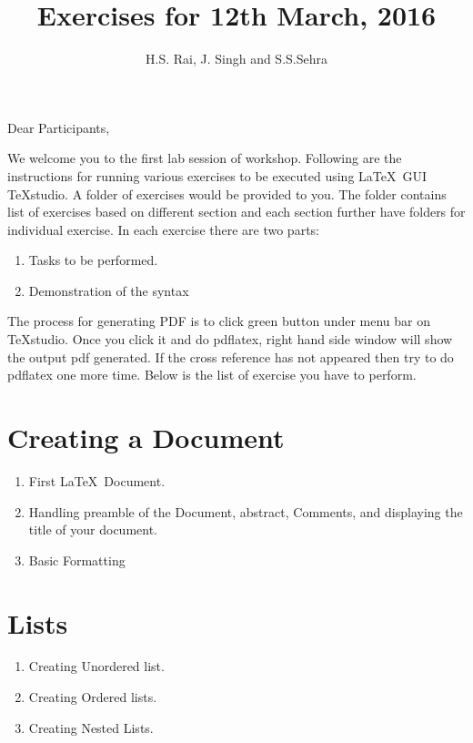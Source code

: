 \documentclass[11pt,a4paper]{article}
\author{H.S. Rai, J. Singh and S.S.Sehra}
\title{Exercises for 12th March, 2016}
\date{}
\begin{document}
\maketitle
Dear Participants,

We welcome you to the  first lab session of workshop. Following are the instructions for running various exercises to be executed using \LaTeX\ GUI \TeX studio. A folder of exercises would be provided to you. The folder contains list of exercises based on different section and each section further have folders for individual exercise. In each exercise there are two parts:
\begin{enumerate}
\item  Tasks to be performed.
\item Demonstration of the syntax
\end{enumerate}

The process for generating PDF is to click green button under menu bar on \TeX studio. Once you click it and do pdflatex, right hand side window will  show the output pdf generated. If the cross reference has not appeared then try to do pdflatex one more time. Below is the list of exercise you have to perform.

 
\section{Creating a Document}
 \begin{enumerate}
 \item First \LaTeX\ Document.
 \item Handling preamble of the Document, abstract, Comments, and displaying the title of your document. 
 \item Basic Formatting
 
 \end{enumerate}
\section{Lists}
 \begin{enumerate}
 \item Creating Unordered list.
 \item Creating Ordered lists.
 \item Creating Nested Lists.
 \end{enumerate}
\end{document}
